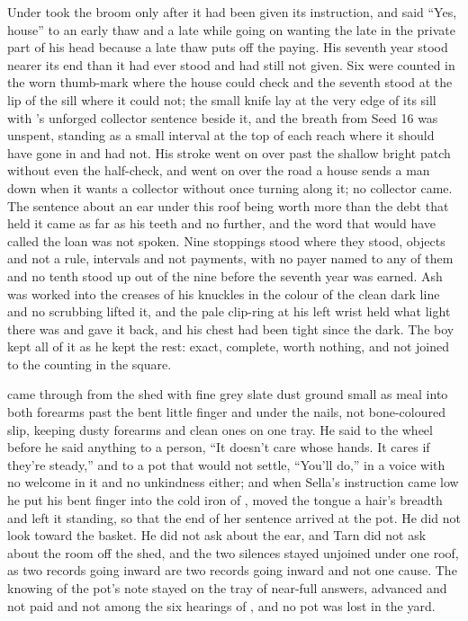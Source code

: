 Under   took the broom only after it had been given its instruction, and said “Yes, house” to an early thaw and a late while going on wanting the late in the private part of his head because a late thaw puts off the paying. His seventh year stood nearer its end than it had ever stood and had still not given. Six were counted in the worn thumb-mark where the house could check and the seventh stood at the lip of the sill where it could not; the small knife lay at the very edge of its sill with 's unforged collector sentence beside it, and the breath from Seed 16 was unspent, standing as a small interval at the top of each reach where it should have gone in and had not. His stroke went on over  past the shallow bright patch without even the half-check, and went on over the road a house sends a man down when it wants a collector without once turning along it; no collector came. The sentence about an ear under this roof being worth more than the debt that held it came as far as his teeth and no further, and the word that would have called the loan was not spoken. Nine stoppings stood where they stood, objects and not a rule, intervals and not payments, with no payer named to any of them and no tenth stood up out of the nine before the seventh year was earned. Ash was worked into the creases of his knuckles in the colour of the clean dark line and no scrubbing lifted it, and the pale clip-ring at his left wrist held what light there was and gave it back, and his chest had been tight since the dark. The boy kept all of it as he kept the rest: exact, complete, worth nothing, and not joined to the counting in the square.

 came through from the shed with fine grey slate dust ground small as meal into both forearms past the bent little finger and under the nails, not bone-coloured slip, keeping dusty forearms and clean ones on one tray. He said to the wheel before he said anything to a person, “It doesn't care whose hands. It cares if they're steady,” and to a pot that would not settle, “You'll do,” in a voice with no welcome in it and no unkindness either; and when Sella's instruction came low he put his bent finger into the cold iron of , moved the tongue a hair's breadth and left it standing, so that the end of her sentence arrived at the pot. He did not look toward the basket. He did not ask about the ear, and Tarn did not ask about the room off the shed, and the two silences stayed unjoined under one roof, as two records going inward are two records going inward and not one cause. The knowing of the pot's note stayed on the tray of near-full answers, advanced and not paid and not among the six hearings of , and no pot was lost in the yard.

